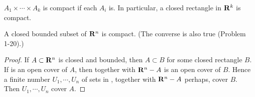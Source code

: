 \begin{corollary}
    $A_1\times \cdots\times A_k$ is compact if each $A_i$ is.
    In particular, a closed rectangle in $\mathbf{R}^k$ is compact. 
\end{corollary}

\begin{corollary}
    A closed bounded subset of $\mathbf{R}^n$ is compact. (The converse is also true (Problem 1-20).)
\end{corollary}

\begin{proof}
    If $A \subset \mathbf{R}^n$ is closed and bounded, then $A \subset B$ for
    some closed rectangle $B$. If  is an open cover of $A$, then 
    together with $\mathbf{R}^n-A$ is an open cover of $B$. Hence a finite
    number $U_1, \cdots , U_n$ of sets in , together 
    with $\mathbf{R}^n-A$ perhaps, cover $B$. Then $U_1, \cdots, U_n$ cover $A$. 
\end{proof}

